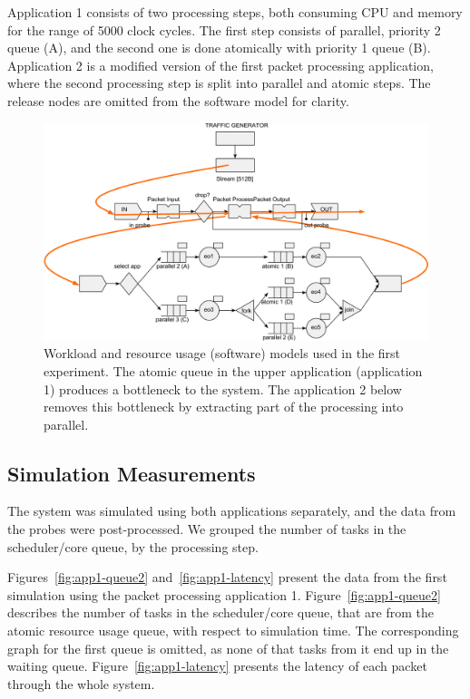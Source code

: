 Application 1 consists of two processing steps, both consuming CPU and memory for the range of 5000 clock cycles. The first step consists of parallel, priority 2 queue (A), and the second one is done atomically with priority 1 queue (B). Application 2 is a modified version of the first packet processing application, where the second processing step is split into parallel and atomic steps. The release nodes are omitted from the software model for clarity.

\begin{figure}[]
  \begin{center}
    \includegraphics[width=\textwidth]{images/pse-models/exp1-software.pdf}
    \caption{Workload and resource usage (software) models used in the first experiment. The atomic queue in the upper application (application 1) produces a bottleneck to the system. The application 2 below removes this bottleneck by extracting part of the processing into parallel.}
    \label{fig:exp1-software}
  \end{center}
\end{figure}

\subsection{Simulation Measurements}
\label{sec:exp1-simulation-measurements}
The system was simulated using both applications separately, and the data from the probes were post-processed. We grouped the number of tasks in the scheduler/core queue, by the processing step.

Figures~\ref{fig:app1-queue2} and~\ref{fig:app1-latency} present the data from the first simulation using the packet processing application 1. Figure~\ref{fig:app1-queue2} describes the number of tasks in the scheduler/core queue, that are from the atomic resource usage queue, with respect to simulation time. The corresponding graph for the first queue is omitted, as none of that tasks from it end up in the waiting queue. Figure~\ref{fig:app1-latency} presents the latency of each packet through the whole system.

